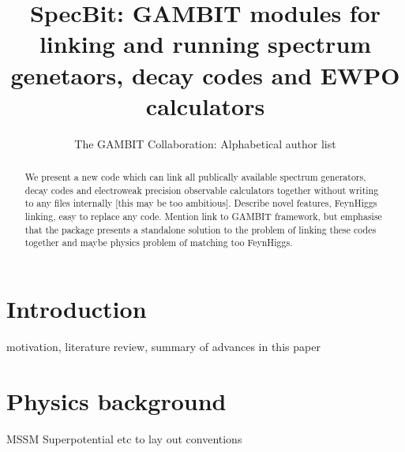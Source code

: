 \documentclass[11pt,a4paper]{article}
\title{SpecBit: GAMBIT modules for linking and running spectrum genetaors, decay codes and EWPO calculators}
\author{The GAMBIT Collaboration: Alphabetical author list} %
\begin{document}
\maketitle

\begin{abstract}
We present a new code which can link all publically available spectrum generators, decay codes and electroweak precision observable calculators together without writing to any files internally [this may be too ambitious]. Describe novel features, FeynHiggs linking, easy to replace any code. Mention link to GAMBIT framework, but emphasise that the package presents a standalone solution to the problem of linking these codes together and maybe physics problem of matching too FeynHiggs.
\end{abstract}

\tableofcontents


\section{Introduction}
motivation, literature review, summary of advances in this paper



\section{Physics background}
MSSM Superpotential etc to lay out conventions
\end{document}
